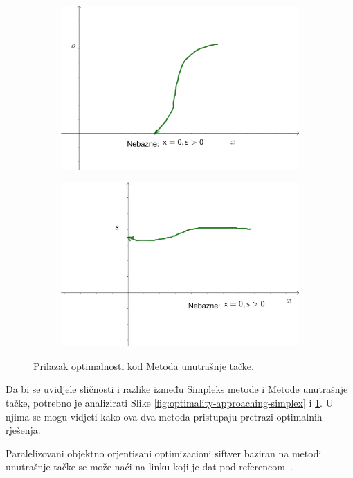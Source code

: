 \documentclass[b5paper, utf8, 11pt, colorlinks]{book}
\theoremstyle{definition}
\begin{document}
\begin{figure}
	\centering
	\begin{subfigure}{.45\textwidth}
		\centering
		\includegraphics[width=.9\linewidth]{interior-3}  
	\end{subfigure}
	\begin{subfigure}{.45\textwidth}
		\centering
		\includegraphics[width=.9\linewidth]{interior-4}  
	\end{subfigure}
	\caption{Prilazak optimalnosti kod Metoda unutrašnje tačke.}
	\label{fig:optimality-approaching-interior}
\end{figure}
Da bi se uvidjele sličnosti i razlike između Simpleks metode i Metode unutrašnje tačke, potrebno je analizirati Slike \ref{fig:optimality-approaching-simplex} i  \ref{fig:optimality-approaching-interior}. U njima se mogu vidjeti kako ova dva metoda pristupaju pretrazi optimalnih rješenja. 

Paralelizovani objektno orjentisani optimizacioni siftver baziran na metodi unutrašnje tačke se može naći na 
linku koji je dat pod referencom~\cite{cite_key25}. 
\end{document}
